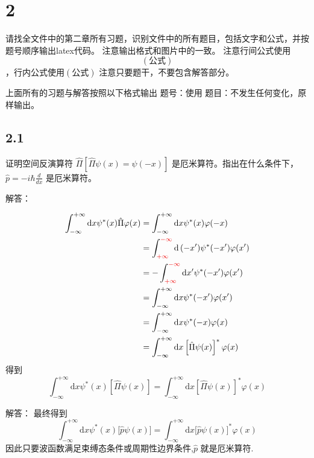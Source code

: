 \section{2}
请找全文件中的第二章所有习题，识别文件中的所有题目，包括文字和公式，并按题号顺序输出latex代码。
注意输出格式和图片中的一致。
注意行间公式使用$$(公式)$$，行内公式使用$(公式)$
注意只要题干，不要包含解答部分。

上面所有的习题与解答按照以下格式输出
题号：使用%
题目：不发生任何变化，原样输出。

\subsection{2.1}
证明空间反演算符 $\hat{\Pi}[\hat{\Pi}\psi(x)=\psi(-x)]$ 是厄米算符。指出在什么条件下，$\hat{p}=-i\hbar\frac{d}{dx}$ 是厄米算符。

解答：

\begin{equation}
    \begin{aligned}
        \int_{-\infty}^{+\infty}{\mathrm{d}x}\psi ^*(x)\hat{\Pi}\varphi (x)&=\int_{-\infty}^{+\infty}{\mathrm{d}x}\psi ^*(x)\varphi (-x)
\\
&=\int_{{\color[RGB]{240, 0, 0} +\infty }}^{{\color[RGB]{240, 0, 0} -\infty }}{\mathrm{d}\left( -x^{\prime} \right)}\psi ^*(-x^{\prime})\varphi (x^{\prime})
\\
&=-\int_{{\color[RGB]{240, 0, 0} +\infty }}^{{\color[RGB]{240, 0, 0} -\infty }}{\mathrm{d}x^{\prime}}\psi ^*(-x^{\prime})\varphi (x^{\prime})
\\
&=\int_{-\infty}^{+\infty}{\mathrm{d}x}\psi ^*(-x^{\prime})\varphi (x^{\prime})
\\
&=\int_{-\infty}^{+\infty}{\mathrm{d}x}\psi ^*(-x)\varphi (x)
\\
&=\int_{-\infty}^{+\infty}{\mathrm{d}x}\left[ \hat{\Pi}\psi (x) \right] ^*\varphi (x)
    \end{aligned}
\end{equation}
得到
\begin{equation}
    \int_{-\infty}^{+\infty}{\mathrm{d}x}\psi ^*(x)\left[ \hat{\Pi}\psi (x) \right] =\int_{-\infty}^{+\infty}{\mathrm{d}x}\left[ \hat{\Pi}\psi (x) \right] ^*\varphi (x)
\end{equation}

解答：
最终得到
\begin{equation}
    \int_{-\infty}^{+\infty}{\mathrm{d}x}\psi ^*(x)\bigl[ \hat{p}\psi (x) \bigr] =\int_{-\infty}^{+\infty}{\mathrm{d}x}\bigl[ \hat{p}\psi (x) \bigr] ^*\varphi (x)
\end{equation}
因此只要波函数满足束缚态条件或周期性边界条件,$\hat{p}$ 就是厄米算符.

